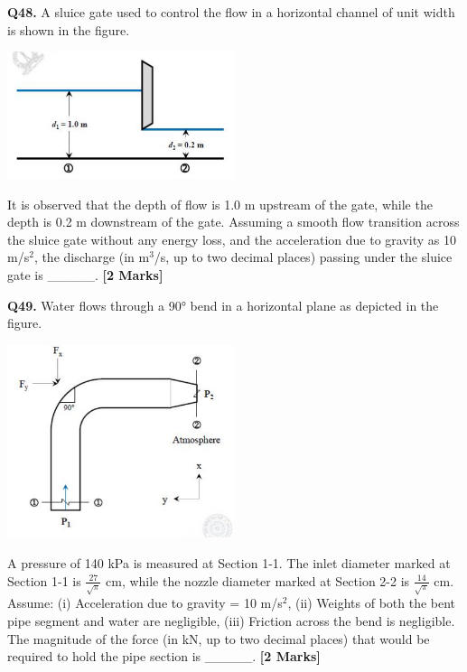 \documentclass[11pt]{article}
\newcommand{\questionb}[2]{
    \noindent\textbf{Q#2.} #1 \hfill \textbf{[2 Marks]}
}
\begin{document}
\vspace{0.5cm}

\questionb{A sluice gate used to control the flow in a horizontal channel of unit width is shown in the figure. 
\begin{center}
\includegraphics[width=0.5\textwidth]{figures/48.png}
\end{center}
It is observed that the depth of flow is 1.0 m upstream of the gate, while the depth is 0.2 m downstream of the gate. Assuming a smooth flow transition across the sluice gate without any energy loss, and the acceleration due to gravity as 10 m/s$^2$, the discharge (in m$^3$/s, up to two decimal places) passing under the sluice gate is \_\_\_\_\_.}{48}

\vspace{0.5cm}

\questionb{Water flows through a 90° bend in a horizontal plane as depicted in the figure.
\begin{center}
\includegraphics[width=0.5\textwidth]{figures/49.png}
\end{center}
A pressure of 140 kPa is measured at Section 1-1. The inlet diameter marked at Section 1-1 is $\frac{27}{\sqrt{\pi}}$ cm, while the nozzle diameter marked at Section 2-2 is $\frac{14}{\sqrt{\pi}}$ cm. Assume: (i) Acceleration due to gravity = 10 m/s$^2$, (ii) Weights of both the bent pipe segment and water are negligible, (iii) Friction across the bend is negligible. The magnitude of the force (in kN, up to two decimal places) that would be required to hold the pipe section is \_\_\_\_\_.}{49}
\end{document}

